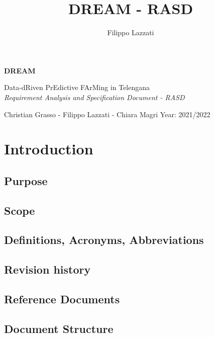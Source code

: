 \documentclass{article}
\title{DREAM - RASD}
\author{Filippo Lazzati}
\begin{document}
\thispagestyle{empty} 
\begin{titlepage}
    \begin{center}
       \vspace*{2cm}
       {\Huge \textbf{DREAM}} %
       \vspace{0.5cm}
       \\
    \begin{LARGE}
        {Data-dRiven PrEdictive FArMing in Telengana}
        \vspace{1.5cm}
        \\
        {\textit{Requirement Analysis and Specification Document - RASD}}
       \vspace{8cm}
        
        {Christian Grasso - Filippo Lazzati - Chiara Magri}
       \vspace{0.5cm}
       {Year: 2021/2022}
       
    \end{LARGE}  
   \end{center}
\end{titlepage}
\newpage
\tableofcontents %
\newpage
\listoftables
\newpage
\section{Introduction}
\subsection{Purpose}
\subsection{Scope}
\subsection{Definitions, Acronyms, Abbreviations}
\subsection{Revision history}
\subsection{Reference Documents}
\subsection{Document Structure}
\end{document}
